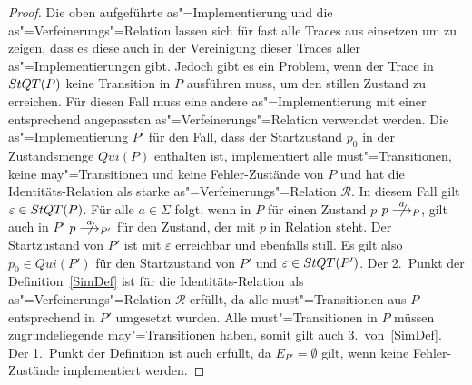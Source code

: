 \begin{proof}
  Die oben aufgeführte as"=Implementierung und die as"=Verfeinerungs"=Relation
  lassen sich für fast alle Traces aus \StQT{} einsetzen um zu zeigen, dass
  es diese auch in der Vereinigung dieser Traces aller as"=Implementierungen
  gibt. Jedoch gibt es ein Problem, wenn der Trace in $StQT (P)$ keine
  Transition in $P$ ausführen muss, um den stillen Zustand zu erreichen. Für
  diesen Fall muss eine andere as"=Implementierung mit einer entsprechend
  angepassten as"=Verfeinerungs"=Relation verwendet werden. Die
  as"=Implementierung $P'$ für den Fall, dass der Startzustand $p_0$ in der
  Zustandsmenge $Qui (P)$ enthalten ist, implementiert alle must"=Transitionen,
  keine may"=Transitionen und keine Fehler-Zustände von $P$ und hat die
  Identitäts-Relation als starke as"=Verfeinerungs"=Relation $\mathcal{R}$. In
  diesem Fall gilt $\varepsilon\in StQT (P)$. Für alle $a\in\Sigma$ folgt, wenn
  in $P$ für einen Zustand $p$ $p\nmust[a]_P$, gilt auch in $P'$ $p
  \nmust[a]_{P'}$ für den Zustand, der mit $p$ in Relation steht. Der
  Startzustand von $P'$ ist mit $\varepsilon$ erreichbar und ebenfalls still.
  Es gilt also $p_0\in Qui (P')$ für den Startzustand von $P'$ und
  $\varepsilon\in StQT (P')$. Der 2.\ Punkt der Definition~\ref{SimDef} ist für
  die Identitäts-Relation als as"=Verfeinerungs"=Relation $\mathcal{R}$
  erfüllt, da alle must"=Transitionen aus $P$ entsprechend in $P'$ umgesetzt
  wurden. Alle must"=Transitionen in $P$ müssen zugrundeliegende
  may"=Transitionen haben, somit gilt auch 3.\ von~\ref{SimDef}. Der 1.\ Punkt
  der Definition ist auch erfüllt, da $E_{P'}=\emptyset$ gilt, wenn keine
  Fehler-Zustände implementiert werden.
\end{proof}

